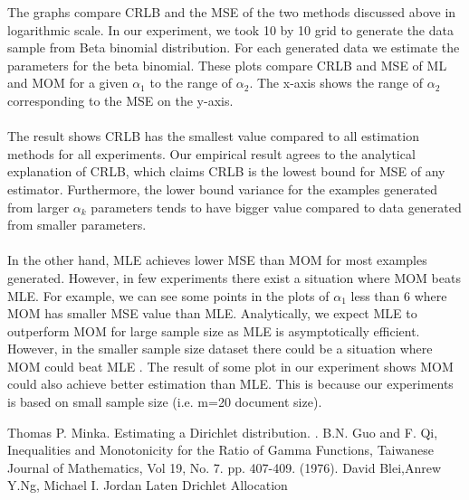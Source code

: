 \documentclass{article} %
\newcommand{\?}{\stackrel{?}{=}}
\begin{document}
The graphs compare CRLB and the MSE of the two methods discussed above in logarithmic scale. In our experiment, we took 10 by 10 grid to generate the data sample from Beta binomial distribution. For each generated data we estimate the parameters for the beta binomial. These plots compare CRLB and MSE of ML and MOM for a given $\alpha_1$  to the range of $\alpha_2$. The x-axis shows the range of $\alpha_2$ corresponding to the MSE on the y-axis.\\
\\ 
The result shows CRLB has the smallest value compared to all estimation methods for all experiments. Our empirical result agrees to the analytical explanation of CRLB, which claims CRLB is the lowest bound for MSE of any estimator. Furthermore, the lower bound variance for the examples generated from larger $\alpha_k$ parameters tends to have bigger value compared to data generated from smaller parameters.\\
\\
In the other hand, MLE achieves lower MSE than MOM  for most examples generated. However, in few experiments there exist a situation where MOM beats MLE. For example, we can see some points in the plots of $\alpha_1$ less than 6 where MOM has smaller MSE value than MLE. Analytically, we expect MLE to outperform MOM for large sample size as MLE is asymptotically efficient. However, in the smaller sample size dataset there could be a situation where MOM could beat MLE . The result of some plot in our experiment shows MOM could also achieve better estimation than MLE. This is because our experiments is based on small sample size (i.e. m=20 document size).
\begin{thebibliography}{9}

Thomas P. Minka.
\newblock Estimating a Dirichlet distribution.
.
 B.N. Guo and F. Qi, 
\newblock Inequalities and Monotonicity for the Ratio of Gamma Functions,
\newblock Taiwanese Journal of Mathematics, 
\newblock Vol 19, No. 7. pp. 407-409. (1976).
David Blei,Anrew Y.Ng, Michael I. Jordan
\newblock Laten Drichlet Allocation
\newblock 

\end{thebibliography}
\end{document}
